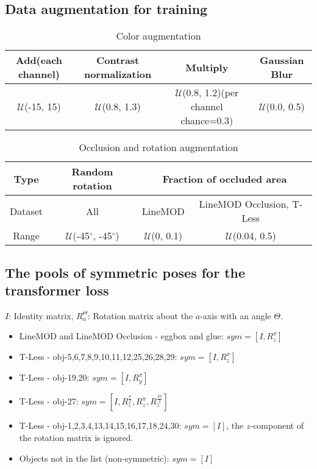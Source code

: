 \documentclass[10pt,twocolumn,letterpaper]{article}
\begin{document}
\subsection{Data augmentation for training}

\begin{table}[hbt]
\begin{center}
\begin{tabular}{ c| c| c| c}
  \hline
  Add(each channel) & Contrast normalization &Multiply  & Gaussian Blur\\
 
 \hline
 $\mathcal{U}$(-15, 15) & $\mathcal{U}$(0.8, 1.3) & $\mathcal{U}$(0.8, 1.2)(per channel chance=0.3) & $\mathcal{U}$(0.0, 0.5) \\
  \hline
\end{tabular}
\end{center}
\caption{Color augmentation}
\end{table}

\begin{table}[hbt]
\begin{center}
\begin{tabular}{ c| c| c |c}
  \hline
  Type &Random rotation &  \multicolumn{2}{c}{Fraction of occluded area}\\
  \hline
  Dataset &All &  LineMOD &  LineMOD Occlusion, T-Less \\
 \hline
   Range &$\mathcal{U}$(-45$^\circ$, -45$^\circ$) & $\mathcal{U}$(0, 0.1)&$\mathcal{U}$(0.04, 0.5)\\
  \hline
\end{tabular}
\end{center}
\caption{Occlusion and rotation augmentation}
\end{table}

\subsection{The pools of symmetric poses for the transformer loss}
$I$: Identity matrix, $R^{\Theta}_a$: Rotation matrix about the $a$-axis with an angle $\Theta$. 
\begin{itemize}
    \setlength\itemsep{0.2em}
    \item{LineMOD and LineMOD Occlusion - eggbox and glue:  $sym=[I,R^{\pi}_z]$ }
    \item{T-Less - obj-5,6,7,8,9,10,11,12,25,26,28,29:  $sym=[I,R^{\pi}_z]$ }
    \item{T-Less - obj-19,20: $sym=[I,R^{\pi}_y]$ }
    \item{T-Less - obj-27: $sym=[I,R^{\frac{\pi}{2}}_z,R^{\pi}_z,R^{\frac{3\pi}{2}}_z]$ }
    \item{T-Less - obj-1,2,3,4,13,14,15,16,17,18,24,30: $sym=[I]$, the $z$-component of the rotation matrix is ignored.}
    \item{Objects not in the list (non-symmetric): $sym=[I]$}
\end{itemize}
\end{document}
